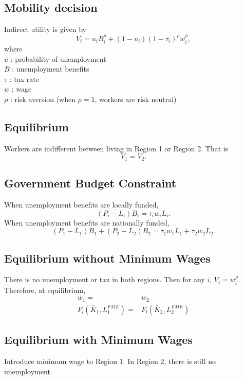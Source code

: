 \documentclass[a4paper, 12pt]{article}
\begin{document}
\subsection{Mobility decision}
Indirect utility is given by
\begin{equation}
V_i = u_iB_i^\rho + (1-u_i)(1-\tau_i)^\rho w_i^\rho,
\end{equation}
where \\
$u$ : probability of unemployment \\
$B$ : unemployment benefits \\
$\tau$ : tax rate \\
$w$ : wage \\
$\rho$ : risk aversion (when $\rho = 1$, workers are risk neutral)

\subsection{Equilibrium}
Workers are indifferent between living in Region 1 or Region 2. That is 
$$V_1 = V_2.$$

\subsection{Government Budget Constraint}
When unemployment benefits are locally funded,
\begin{equation}
(P_i - L_i)B_i = \tau_iw_iL_i.
\end{equation}
When unemployment benefits are nationally funded,
\begin{equation}
(P_1 - L_1)B_1 + (P_2 - L_2)B_2= \tau_1w_1L_1 + \tau_2w_2L_2.
\end{equation}

\subsection{Equilibrium without Minimum Wages}

There is no unemployment or tax in both regions. Then for any $i$, $V_i = w_i^\rho$. Therefore, at equilibrium,
\begin{align*}
w_1 =& w_2 \\
F_l(\bar{K}_1, L^{FME}_1) =& F_l(\bar{K}_2, L^{FME}_2)
\end{align*}

\subsection{Equilibrium with Minimum Wages}
Introduce minimum wage to Region 1. In Region 2, there is still no unemployment.
\end{document}

